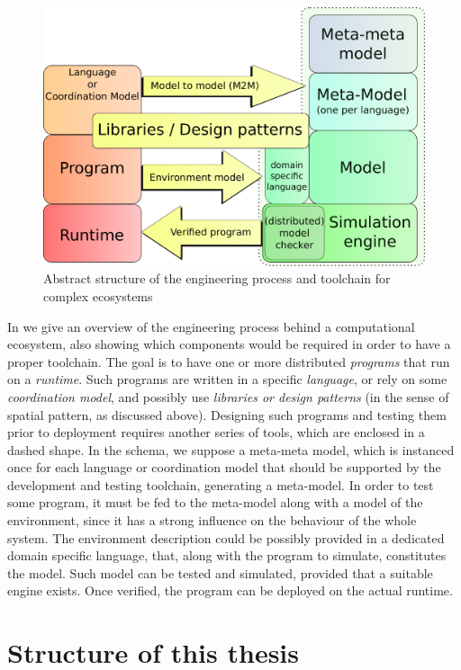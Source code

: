 \documentclass[12pt,a4paper,twoside,openright]{book}
\begin{document}
\begin{figure}
	\centering
	\includegraphics[width=\textwidth]{img/schemas/contribution}
	\caption[Engineering Computational Ecosystems]{Abstract structure of the engineering process and toolchain for complex ecosystems}
	\label{img:contribution}
\end{figure}

In  we give an overview of the engineering process behind a computational ecosystem, also showing which components would be required in order to have a proper toolchain.
%
The goal is to have one or more distributed \emph{programs} that run on a \textit{runtime}.
%
Such programs are written in a specific \textit{language}, or rely on some \emph{coordination model}, and possibly use \emph{libraries or design patterns} (in the sense of spatial pattern, as discussed above).
%
Designing such programs and testing them prior to deployment requires another series of tools, which are enclosed in a dashed shape.
%
In the schema, we suppose a meta-meta model, which is instanced once for each language or coordination model that should be supported by the development and testing toolchain, generating a meta-model.
%
In order to test some program, it must be fed to the meta-model along with a model of the environment, since it has a strong influence on the behaviour of the whole system.
%
The environment description could be possibly provided in a dedicated domain specific language, that, along with the program to simulate, constitutes the model.
%
Such model can be tested and simulated, provided that a suitable engine exists.
%
Once verified, the program can be deployed on the actual runtime.

\section{Structure of this thesis}
\end{document}

